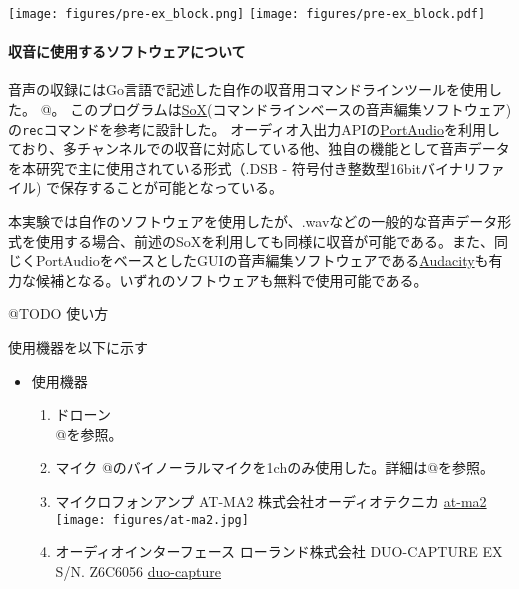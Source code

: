 \texttt{[image: figures/pre-ex\_block.png]}
\texttt{[image: figures/pre-ex\_block.pdf]}

\hypertarget{ux53ceux97f3ux306bux4f7fux7528ux3059ux308bux30bdux30d5ux30c8ux30a6ux30a7ux30a2ux306bux3064ux3044ux3066}{%
\paragraph{収音に使用するソフトウェアについて}\label{ux53ceux97f3ux306bux4f7fux7528ux3059ux308bux30bdux30d5ux30c8ux30a6ux30a7ux30a2ux306bux3064ux3044ux3066}}

音声の収録にはGo言語で記述した自作の収音用コマンドラインツールを使用した。
@。
このプログラムは\href{http://sox.sourceforge.net/}{SoX}(コマンドラインベースの音声編集ソフトウェア)の\texttt{rec}コマンドを参考に設計した。
オーディオ入出力APIの\href{http://www.portaudio.com/}{PortAudio}を利用しており、多チャンネルでの収音に対応している他、独自の機能として音声データを本研究で主に使用されている形式（.DSB
- 符号付き整数型16bitバイナリファイル)
で保存することが可能となっている。

本実験では自作のソフトウェアを使用したが、.wavなどの一般的な音声データ形式を使用する場合、前述のSoXを利用しても同様に収音が可能である。また、同じくPortAudioをベースとしたGUIの音声編集ソフトウェアである\href{https://www.audacityteam.org/}{Audacity}も有力な候補となる。いずれのソフトウェアも無料で使用可能である。

@TODO 使い方

使用機器を以下に示す

\begin{itemize}
\tightlist
\item
  使用機器

  \begin{enumerate}
  \def\labelenumi{\arabic{enumi}.}
  \item
    ドローン\\
    @を参照。
  \item
    マイク @のバイノーラルマイクを1chのみ使用した。詳細は@を参照。
  \item
    マイクロフォンアンプ AT-MA2 株式会社オーディオテクニカ
    \href{https://www.audio-technica.co.jp/product/AT-MA2}{at-ma2}
    \texttt{[image: figures/at-ma2.jpg]}
  \item
    オーディオインターフェース ローランド株式会社 DUO-CAPTURE EX S/N.
    Z6C6056
    \href{https://www.roland.com/jp/products/duo-capture_ex/}{duo-capture}
  \end{enumerate}
\end{itemize}

